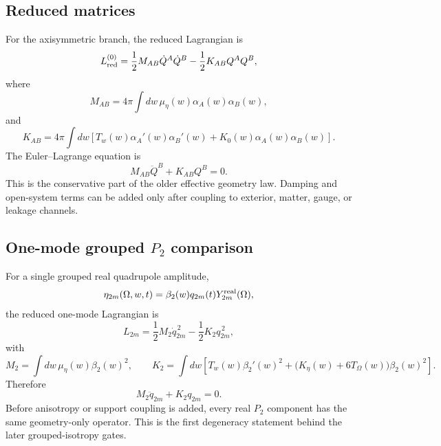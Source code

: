 \subsection{Reduced matrices}
\label{subsec:part01-breathing-matrices}

For the axisymmetric branch, the reduced Lagrangian is
\begin{equation}
\label{eq:part01-breathing-Lred}
L_{\rm red}^{(0)}
=
\frac12M_{AB}\dot Q^A\dot Q^B
-
\frac12K_{AB}Q^AQ^B,
\end{equation}
where
\begin{equation}
\label{eq:part01-breathing-M}
\boxed{
M_{AB}
=
4\pi\int dw\,\mu_\eta(w)\alpha_A(w)\alpha_B(w)},
\end{equation}
and
\begin{equation}
\label{eq:part01-breathing-K}
\boxed{
K_{AB}
=
4\pi\int dw\left[
T_w(w)\alpha_A'(w)\alpha_B'(w)
+
K_0(w)\alpha_A(w)\alpha_B(w)
\right]}.
\end{equation}
The Euler--Lagrange equation is
\begin{equation}
\label{eq:part01-breathing-EOM}
\boxed{
M_{AB}\ddot Q^B+K_{AB}Q^B=0}.
\end{equation}
This is the conservative part of the older effective geometry law.  Damping and open-system terms can be added only after coupling to exterior, matter, gauge, or leakage channels.

\subsection{One-mode grouped \texorpdfstring{\(P_2\)}{P2} comparison}
\label{subsec:part01-p2-one-mode-comparison}

For a single grouped real quadrupole amplitude,
\begin{equation}
\eta_{2m}(\Omega,w,t)=\beta_2(w)q_{2m}(t)Y_{2m}^{\rm real}(\Omega),
\end{equation}
the reduced one-mode Lagrangian is
\begin{equation}
L_{2m}
=
\frac12M_2\dot q_{2m}^{\,2}-\frac12K_2q_{2m}^{\,2},
\end{equation}
with
\begin{equation}
\label{eq:part01-M2-K2}
\boxed{
M_2=\int dw\,\mu_\eta(w)\beta_2(w)^2,
\qquad
K_2=\int dw\left[T_w(w)\beta_2'(w)^2+\bigl(K_\eta(w)+6T_\Omega(w)\bigr)\beta_2(w)^2\right]}.
\end{equation}
Therefore
\begin{equation}
M_2\ddot q_{2m}+K_2q_{2m}=0.
\end{equation}
Before anisotropy or support coupling is added, every real \(P_2\) component has the same geometry-only operator.  This is the first degeneracy statement behind the later grouped-isotropy gates.

